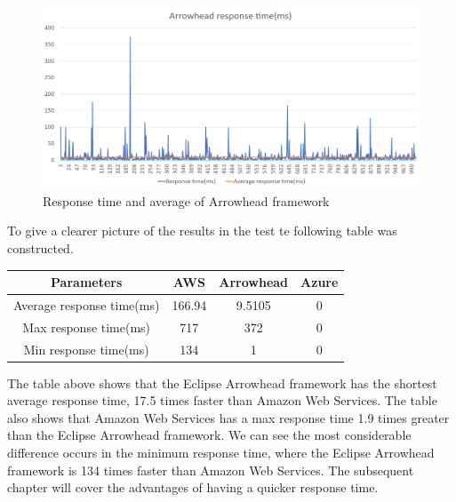 \begin{figure}[h!]
    \centering
    \includegraphics[width=\textwidth]{Pictures/AH_response_time.png} 
    \caption{Response time and average of Arrowhead framework}
    \label{AH response time}
\end{figure}

To give a clearer picture of the results in the test te following table was constructed. 
\begin{center}
    \begin{tabular}{||c|c|c|c||}
        \hline
        Parameters & AWS & Arrowhead & Azure  \\
        \hline\hline
        Average response time(ms) & 166.94 & 9.5105 & 0\\
        Max response time(ms) & 717 & 372 & 0 \\
        Min response time(ms) & 134 & 1 & 0 \\
        \hline
    \end{tabular}
\end{center}
The table above shows that the Eclipse Arrowhead framework has the shortest average response time, 17.5 times faster than Amazon Web Services. 
The table also shows that Amazon Web Services has a max response time  1.9 times greater than the Eclipse Arrowhead framework.
We can see the most considerable difference occurs in the minimum response time, where the Eclipse Arrowhead framework is 134 times faster than Amazon Web Services.
The subsequent chapter will cover the advantages of having a quicker response time.


